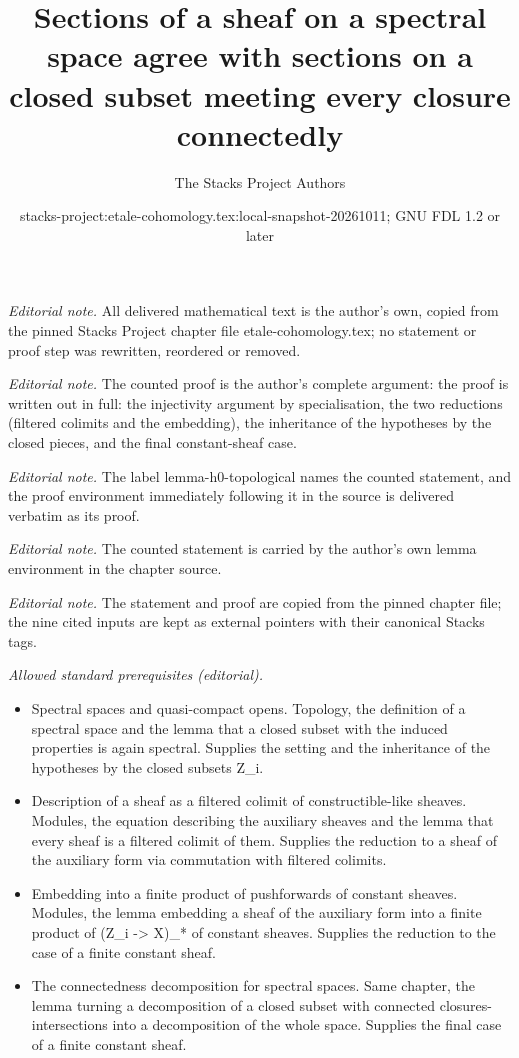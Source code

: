 \documentclass[10pt,a4paper]{amsart}
\title{Sections of a sheaf on a spectral space agree with sections on a closed subset meeting every closure connectedly}
\author{The Stacks Project Authors}
\date{stacks-project:etale-cohomology.tex:local-snapshot-20261011; GNU FDL 1.2 or later}
\theoremstyle{plain}
\theoremstyle{definition}
\theoremstyle{remark}
\numberwithin{equation}{subsection}
\begin{document}
\maketitle
\noindent\textit{Editorial note.} All delivered mathematical text is the author's own, copied from the pinned Stacks Project chapter file etale-cohomology.tex; no statement or proof step was rewritten, reordered or removed.\par\medskip
\noindent\textit{Editorial note.} The counted proof is the author's complete argument: the proof is written out in full: the injectivity argument by specialisation, the two reductions (filtered colimits and the embedding), the inheritance of the hypotheses by the closed pieces, and the final constant-sheaf case.\par\medskip
\noindent\textit{Editorial note.} The label lemma-h0-topological names the counted statement, and the proof environment immediately following it in the source is delivered verbatim as its proof.\par\medskip
\noindent\textit{Editorial note.} The counted statement is carried by the author's own lemma environment in the chapter source.\par\medskip
\noindent\textit{Editorial note.} The statement and proof are copied from the pinned chapter file; the nine cited inputs are kept as external pointers with their canonical Stacks tags.\par\medskip
\noindent\textit{Allowed standard prerequisites (editorial).}\begin{itemize}
\item Spectral spaces and quasi-compact opens. Topology, the definition of a spectral space and the lemma that a closed subset with the induced properties is again spectral. Supplies the setting and the inheritance of the hypotheses by the closed subsets Z\_i.
\item Description of a sheaf as a filtered colimit of constructible-like sheaves. Modules, the equation describing the auxiliary sheaves and the lemma that every sheaf is a filtered colimit of them. Supplies the reduction to a sheaf of the auxiliary form via commutation with filtered colimits.
\item Embedding into a finite product of pushforwards of constant sheaves. Modules, the lemma embedding a sheaf of the auxiliary form into a finite product of (Z\_i -> X)\_* of constant sheaves. Supplies the reduction to the case of a finite constant sheaf.
\item The connectedness decomposition for spectral spaces. Same chapter, the lemma turning a decomposition of a closed subset with connected closures-intersections into a decomposition of the whole space. Supplies the final case of a finite constant sheaf.
\end{itemize}\medskip
\end{document}
